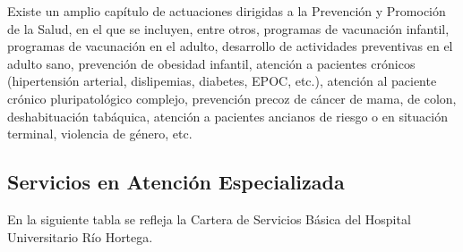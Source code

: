 Existe un amplio capítulo de actuaciones dirigidas a la Prevención y Promoción de la Salud, en el que se incluyen, entre otros, programas de vacunación infantil, programas de vacunación en el adulto, desarrollo de actividades preventivas en el adulto sano, prevención de obesidad infantil, atención a pacientes crónicos (hipertensión arterial, dislipemias, diabetes, EPOC, etc.), atención al paciente crónico pluripatológico complejo, prevención precoz de cáncer de mama, de colon, deshabituación tabáquica, atención a pacientes ancianos de riesgo o en situación terminal, violencia de género, etc.

\subsection{Servicios en Atención Especializada}

En la siguiente tabla se refleja la Cartera de Servicios Básica del Hospital Universitario Río Hortega.

